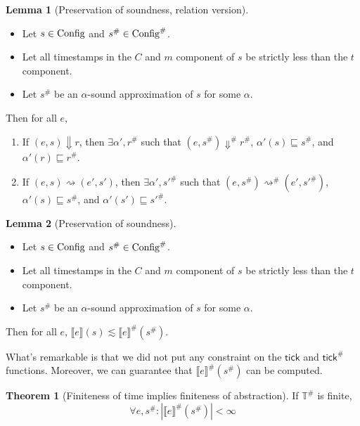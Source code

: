 \documentclass[acmsmall,screen,review]{acmart}
\theoremstyle{definition}
\newtheorem{lem}{Lemma}[section]
\newtheorem{thm}{Theorem}[section]
\newcommand*{\A}[1]{{#1}^{\#}}
\newcommand*{\Time}{\mathbb{T}}
\newcommand*{\ATime}{\A{\Time}}
\newcommand*{\mem}{m}
\newcommand*{\Config}[1]{\text{Config}\vphantom{#1}}
\newcommand*{\AConfig}[1]{\A{\text{Config}}\vphantom{#1}}
\newcommand*{\sembracket}[1]{\lBrack{#1}\rBrack}
\newcommand*{\tick}{\mathsf{tick}}
\begin{document}
\begin{lem}[Preservation of soundness, relation version]
  $\:$

  \begin{itemize}
    \item Let $s\in\Config{\Time}$ and $\A{s}\in\AConfig{\ATime}$.
    \item Let all timestamps in the $C$ and $\mem$ component of $s$ be strictly less than the $t$ component.
    \item Let $\A{s}$ be an $\alpha$-sound approximation of $s$ for some $\alpha$.
  \end{itemize}

  Then for all $e$,
  \begin{enumerate}
    \item If $(e,s)\Downarrow r$, then $\exists\alpha',\A{r}$ such that $(e,\A{s})\A\Downarrow\A{r}$, $\alpha'(s)\sqsubseteq\A{s}$, and $\alpha'(r)\sqsubseteq\A{r}$.
    \item If $(e,s)\rightsquigarrow (e',s')$, then $\exists\alpha', \A{s'}$ such that $(e,\A{s})\A\rightsquigarrow(e',\A{s'})$, $\alpha'(s)\sqsubseteq\A{s}$, and $\alpha'(s')\sqsubseteq\A{s'}$.
  \end{enumerate}
\end{lem}

\begin{lem}[Preservation of soundness]
  $\:$

  \begin{itemize}
    \item Let $s\in\Config{\Time}$ and $\A{s}\in\AConfig{\ATime}$.
    \item Let all timestamps in the $C$ and $\mem$ component of $s$ be strictly less than the $t$ component.
    \item Let $\A{s}$ be an $\alpha$-sound approximation of $s$ for some $\alpha$.
  \end{itemize}

  Then for all $e$, $\sembracket{e}(s)\lesssim\A{\sembracket{e}}(\A{s})$.
\end{lem}

What's remarkable is that we did not put any constraint on the $\tick$ and $\A{\tick}$ functions.
Moreover, we can guarantee that $\A{\sembracket{e}}(\A{s})$ can be computed.

\begin{thm}[Finiteness of time implies finiteness of abstraction]
  If $\ATime$ is finite,
  \[
    \forall e,\A{s}: |\A{\sembracket{e}}(\A{s})|<\infty
  \]
\end{thm}
\end{document}
